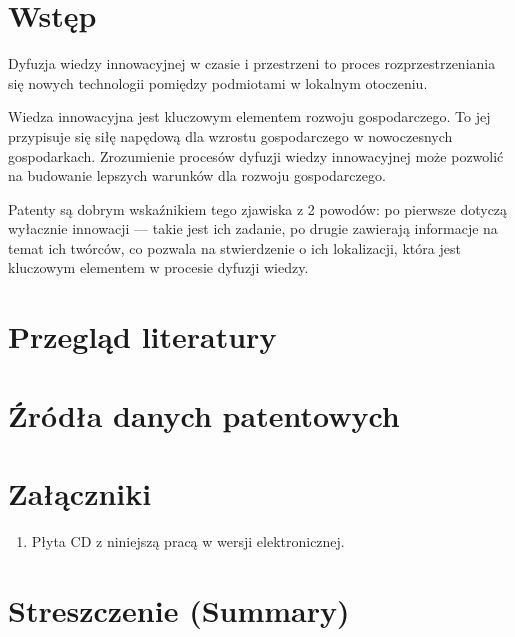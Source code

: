\documentclass[12pt, withmarginpar]{mwbk}
\begin{document}


\tableofcontents

\chapter*{Wstęp}

Dyfuzja wiedzy innowacyjnej w czasie i przestrzeni to proces
rozprzestrzeniania się nowych technologii pomiędzy podmiotami
w lokalnym otoczeniu.

Wiedza innowacyjna jest kluczowym elementem rozwoju gospodarczego.
To jej przypisuje się siłę napędową dla wzrostu gospodarczego
w nowoczesnych gospodarkach. Zrozumienie procesów dyfuzji 
wiedzy innowacyjnej może pozwolić na budowanie lepszych 
warunków dla rozwoju gospodarczego.

Patenty są dobrym wskaźnikiem tego zjawiska z 2 powodów:
po pierwsze dotyczą wyłacznie innowacji --- takie jest ich zadanie,
po drugie zawierają informacje na temat ich twórców, co pozwala
na stwierdzenie o ich lokalizacji, która jest kluczowym elementem
w procesie dyfuzji wiedzy.


\chapter{Przegląd literatury}\label{ch:intro}



\chapter{Źródła danych patentowych}\label{ch:data}











\listoffigures

\listoftables

\chapter*{Załączniki}
\begin{enumerate}
\item Płyta CD z niniejszą pracą w wersji elektronicznej.
\end{enumerate}

\chapter*{Streszczenie (Summary)}

\bigskip

\bigskip

\begin{center}
  \textbf{\tytul}
\end{center}

\bigskip

\begin{center}
  \textbf{\textit{\tytulangielski}}
\end{center}

{\it

}
\end{document}
